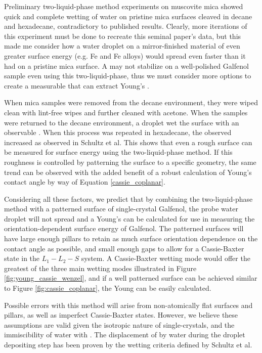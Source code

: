 Preliminary two-liquid-phase method experiments on muscovite mica showed quick and complete wetting of water on pristine mica surfaces cleaved in decane and hexadecane, contradictory to published results.\cite{Schultz1992} Clearly, more iterations of this experiment must be done to recreate this seminal paper's data, but this made me consider how a water droplet on a mirror-finished material of even greater surface energy (e.g. Fe and Fe alloys) would spread even faster than it had on a pristine mica surface. A \ca may not stabilize on a well-polished Galfenol sample even using this two-liquid-phase, thus we must consider more options to create a measurable \ca that can extract Young's \ca. 

When mica samples were removed from the decane environment, they were wiped clean with lint-free wipes and further cleaned with acetone. When the samples were returned to the decane environment, a droplet wet the surface with an observable \ca. When this process was repeated in hexadecane, the observed \ca increased as observed in Schultz et al. This shows that even a rough surface can be measured for surface energy using the two-liquid-phase method. If this roughness is controlled by patterning the surface to a specific geometry, the same trend can be observed with the added benefit of a robust calculation of Young's contact angle by way of Equation \ref{cassie_coplanar}. 

Considering all these factors, we predict that by combining the two-liquid-phase method with a patterned surface of single-crystal Galfenol, the probe water droplet will not spread and a Young's \ca can be calculated for use in measuring the orientation-dependent surface energy of Galfenol. The patterned surfaces will have large enough pillars to retain as much surface orientation dependence on the contact angle as possible, and small enough gaps to allow for a Cassie-Baxter state in the $ L_1-L_2-S $ system. A Cassie-Baxter wetting mode would offer the greatest \ca of the three main wetting modes illustrated in Figure \ref{fig:young_cassie_wenzel}, and if a well patterned surface can be achieved similar to Figure \ref{fig:cassie_coplanar}, the Young \ca can be easily calculated. 

Possible errors with this method will arise from non-atomically flat surfaces and pillars, as well as imperfect Cassie-Baxter states. However, we believe these assumptions are valid given the isotropic nature of single-crystals, and the immiscibility of water with \nalk[s]. The displacement of \nalk[s] by water during the droplet depositing step has been proven by the wetting criteria defined by Schultz et al.\cite{Schultz1992}

